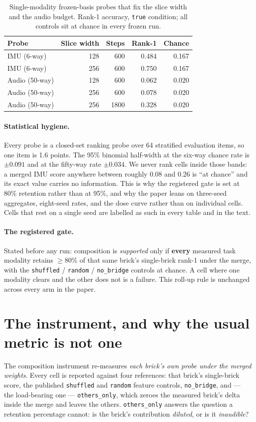 \documentclass[11pt]{article}
\begin{document}
\begin{table}[t]
\centering
\caption{Single-modality frozen-basis probes that fix the slice width and the audio budget. Rank-1 accuracy, \texttt{true} condition; all controls sit at chance in every frozen run.}
\label{tab:pilot}
\begin{tabular}{lrrrr}
\toprule
Probe & Slice width & Steps & Rank-1 & Chance \\
\midrule
IMU (6-way) & 128 & 600 & 0.484 & 0.167 \\
IMU (6-way) & 256 & 600 & 0.750 & 0.167 \\
Audio (50-way) & 128 & 600 & 0.062 & 0.020 \\
Audio (50-way) & 256 & 600 & 0.078 & 0.020 \\
Audio (50-way) & 256 & 1800 & 0.328 & 0.020 \\
\bottomrule
\end{tabular}
\end{table}

\paragraph{Statistical hygiene.}
Every probe is a closed-set ranking probe over 64 stratified evaluation items, so one item is 1.6 points. The 95\% binomial half-width at the six-way chance rate is $\pm0.091$ and at the fifty-way rate $\pm0.034$. We never rank cells inside those bands: a merged IMU score anywhere between roughly 0.08 and 0.26 is ``at chance'' and its exact value carries no information. This is why the registered gate is set at 80\% retention rather than at 95\%, and why the paper leans on three-seed aggregates, eight-seed rates, and the dose curve rather than on individual cells. Cells that rest on a single seed are labelled as such in every table and in the text.

\paragraph{The registered gate.}
Stated before any run: composition is \emph{supported} only if \textbf{every} measured task modality retains $\ge 80\%$ of that same brick's single-brick rank-1 under the merge, with the \texttt{shuffled} / \texttt{random} / \texttt{no\_bridge} controls at chance. A cell where one modality clears and the other does not is a failure. This roll-up rule is unchanged across every arm in the paper.

\section{The instrument, and why the usual metric is not one}
\label{sec:instrument}
The composition instrument re-measures \emph{each brick's own probe under the merged weights}. Every cell is reported against four references: that brick's single-brick score, the published \texttt{shuffled} and \texttt{random} feature controls, \texttt{no\_bridge}, and --- the load-bearing one --- \texttt{others\_only}, which zeroes the measured brick's delta inside the merge and leaves the others. \texttt{others\_only} answers the question a retention percentage cannot: is the brick's contribution \emph{diluted}, or is it \emph{inaudible}?
\end{document}
